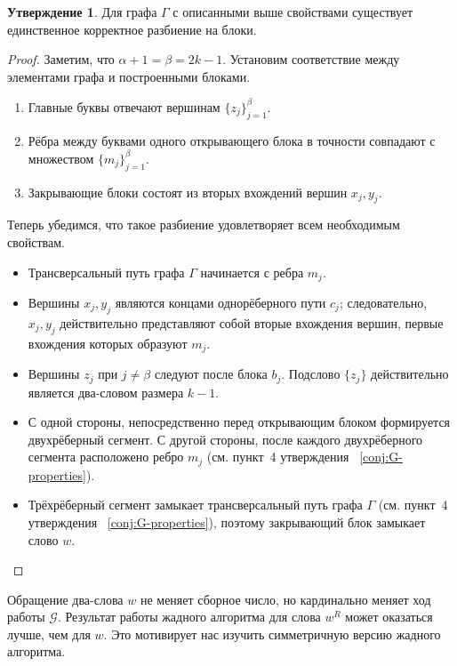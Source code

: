 \documentclass{article}
\theoremstyle{definition}
\newtheorem{conjecture}[theorem]{Утверждение}
\newcommand{\G}{\mathcal{G}}
\begin{document}
\begin{conjecture}\label{conj:max-An-generic-struct}
    Для графа \(\Gamma\) с описанными выше свойствами существует 
    единственное корректное разбиение на блоки.
\end{conjecture}

\begin{proof}
    Заметим, что \(\alpha + 1 = \beta = 2k - 1\).
    Установим соответствие между элементами графа и построенными блоками.
    \begin{enumerate}
        \item Главные буквы отвечают вершинам \(\{z_j\}_{j=1}^\beta\).
        \item Рёбра между буквами одного открывающего блока в точности 
        совпадают с множеством \(\{m_j\}_{j=1}^\beta\).
        \item Закрывающие блоки состоят из вторых вхождений вершин 
        \(x_j, y_j\).
    \end{enumerate}

    Теперь убедимся, что такое разбиение удовлетворяет всем необходимым 
    свойствам.
    \begin{itemize}
        \item Трансверсальный путь графа \(\Gamma\) начинается с ребра 
        \(m_j\).
        \item Вершины \(x_j, y_j\) являются концами однорёберного пути 
        \(c_j\); следовательно, \(x_j, y_j\) действительно представляют 
        собой вторые вхождения вершин, первые вхождения которых образуют 
        \(m_j\).
        \item Вершины \(z_j\) при \(j \neq \beta\) следуют после блока 
        \(b_j\). Подслово \(\{z_j\}\) действительно является два-словом 
        размера \(k - 1\).
        \item С одной стороны, непосредственно перед открывающим блоком формируется двухрёберный сегмент. С другой стороны, после каждого двухрёберного сегмента расположено ребро $m_j$ (см. пункт~4 утверждения ~\ref{conj:G-properties}).
        \item Трёхрёберный сегмент замыкает трансверсальный путь графа 
        \(\Gamma\) (см. пункт~4 утверждения ~\ref{conj:G-properties}), 
        поэтому закрывающий блок замыкает слово \(w\).
    \end{itemize}
\end{proof}

Обращение два-слова $w$ не меняет сборное число, но кардинально меняет ход работы $\G$. Результат работы жадного алгоритма для слова $w^R$ может оказаться лучше, чем для $w$. Это мотивирует нас изучить симметричную версию жадного алгоритма.
\end{document}
